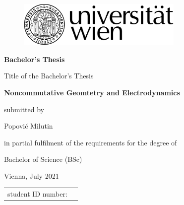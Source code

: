 \begin{titlepage}

\begin{center}
\begin{figure}
\hspace{8.8cm}
\includegraphics[width=8cm]{pics/uni_logo}
\end{figure}
\vspace*{2cm}

    \fontsize{22}{0} \selectfont \textbf{Bachelor's Thesis}\\

\vspace*{2.5cm}

\fontsize{12}{0} \selectfont Title of the Bachelor's Thesis\\

\vspace*{0.3cm}

\fontsize{18}{0} \selectfont \textbf{Noncommutative Geomtetry and
Electrodynamics}\\

\vspace*{1.5cm}

    {\fontsize{12}{0} \selectfont submitted by}\\
\vspace*{0.3cm}

    { \fontsize{14}{0} \selectfont Popović Milutin}\\

\vspace*{2cm}

    {\fontsize{12}{0} \selectfont  in partial fulfilment of the requirements for the degree of}\\
\vspace*{0.3cm}

    { \fontsize{14}{0} \selectfont Bachelor of Science (BSc)}\\
\vspace*{2cm}

    { \fontsize{10}{0} \selectfont Vienna, July 2021}\\

\vspace*{3.0cm}

\begin{tabular}{p{9cm}p{11.25cm}}
        \fontsize{10}{0} \selectfont
        student ID number:\vspace*{0.3cm}& \fontsize{10}{0} \selectfont 11807930\\


\end{tabular}
\end{center}
\end{titlepage}
